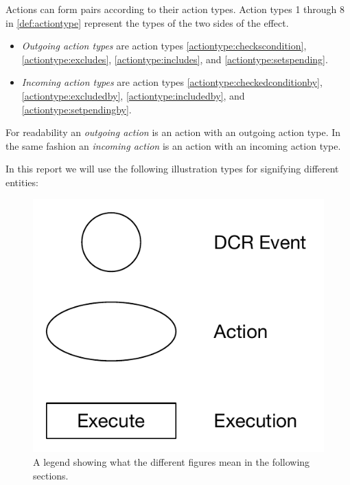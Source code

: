     \newpar	Actions can form pairs according to their action types. Action types 1 through 8 in \autoref{def:actiontype} represent the types of the two sides of the effect.
	
	\begin{itemize}
		\item \textit{Outgoing action types} are action types \ref{actiontype:checkscondition}, \ref{actiontype:excludes}, \ref{actiontype:includes}, and \ref{actiontype:setspending}.
		\item \textit{Incoming action types} are action types \ref{actiontype:checkedconditionby}, \ref{actiontype:excludedby}, \ref{actiontype:includedby}, and \ref{actiontype:setpendingby}. 
	\end{itemize}
    
    \noindent For readability an \textit{outgoing action} is an action with an outgoing action type. In the same fashion an \textit{incoming action} is an action with an incoming action type.
    
    \newpar In this report we will use the following illustration types for signifying different entities:
    
    \begin{figure}[H]
		\centering
		\includegraphics[height=0.20\textheight]{3local/images/legend.pdf}
		\caption{A legend showing what the different figures mean in the following sections.}
		\label{fig:representing:legend}
	\end{figure}
    
